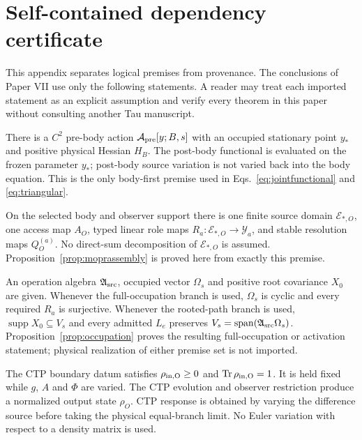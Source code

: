 \section{Self-contained dependency certificate}
\label{app:dependencycertificate}

This appendix separates logical premises from provenance.  The conclusions of
Paper VII use only the following statements.  A reader may treat each imported
statement as an explicit assumption and verify every theorem in this paper
without consulting another Tau manuscript.

\begin{description}[style=nextline,leftmargin=2.8em,labelwidth=2.2em]
\item[\textbf{D1: body-first order.}]
There is a $C^2$ pre-body action $\mathcal A_{\rm pre}[y;B,s]$ with an occupied
stationary point $y_*$ and positive physical Hessian $H_B$.  The post-body
functional is evaluated on the frozen parameter $y_*$; post-body source
variation is not varied back into the body equation.  This is the only
body-first premise used in Eqs.~\eqref{eq:jointfunctional} and
\eqref{eq:triangular}.

\item[\textbf{D2: common typed source domain.}]
On the selected body and observer support there is one finite source domain
$\mathcal E_{*,O}$, one access map $A_O$, typed linear role maps
$R_a:\mathcal E_{*,O}\to\mathcal Y_a$, and stable resolution maps
$Q_O^{(a)}$.  No direct-sum decomposition of $\mathcal E_{*,O}$ is assumed.
Proposition~\ref{prop:moprassembly} is proved here from exactly this premise.

\item[\textbf{D3: occupied operation data.}]
An operation algebra $\mathfrak A_{\rm src}$, occupied vector $\Omega_s$ and
positive root covariance $X_0$ are given.  Whenever the full-occupation branch
is used, $\Omega_s$ is cyclic and every required $R_a$ is surjective.
Whenever the rooted-path branch is used,
$\operatorname{supp}X_0\subseteq V_s$ and every admitted $L_e$ preserves
$V_s=\operatorname{span}(\mathfrak A_{\rm src}\Omega_s)$.
Proposition~\ref{prop:occupation} proves the resulting full-occupation or
activation statement; physical realization of either premise set is not
imported.

\item[\textbf{D4: fixed quantum preparation.}]
The CTP boundary datum satisfies $\rho_{\rm in,O}\geq0$ and
$\operatorname{Tr}\rho_{\rm in,O}=1$.  It is held fixed while $g$, $A$ and
$\Phi$ are varied.  The CTP evolution and observer restriction produce a
normalized output state $\rho_O$.  CTP response is obtained by varying the
difference source before taking the physical equal-branch limit.  No Euler
variation with respect to a density matrix is used.


\end{description}
